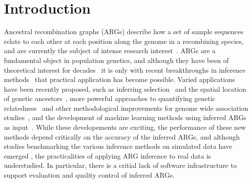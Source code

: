 \documentclass[unnumsec,webpdf,contemporary,large,namedate]{oup-authoring-template}%
\begin{document}
 \maketitle 

\section{Introduction} 
Ancestral recombination graphs (ARGs) describe how a set of sample
sequences relate to each other at each position along the genome in a recombining
species, and are currently the subject of intense research 
interest~\citep{brandt2024promise,lewanski2024era,nielsen2024inference,
wong2024general}. ARGs are a fundamental object in population genetics,
and although they have been of theoretical interest for
decades~\citep{Hudson1983,Griffiths1997} it is only with recent breakthroughs
in inference methods~\citep{rasmussen2014genome,
speidel2019method,kelleher2019inferring,wohns2022unified,zhang2023biobank,
gunnarsson2024scalable,deng2024robust} that practical application has 
become possible. Varied applications have been recently proposed,
such as inferring selection~\citep{stern2019approximate,hejase2022deep} and 
the spatial 
location of genetic
ancestors~\citep{osmond2024estimating,deraje2024inferring,grundler2024geographic},
more powerful approaches to quantifying genetic 
relatedness~\citep{fan2022genealogical,zhang2023biobank,gunnarsson2024scalable,lehmann2025on}
and other methodological improvements for genome wide association 
studies~\citep{nowbandegani2023extremely,link2023tree},
and the development of machine learning methods using inferred
ARGs as input~\citep{hejase2022deep,pearson2023local,korfmann2024simultaneous,
whitehouse2024tree}.
While these developements are exciting, the performance 
of these new methods depend critically on the accuracy of the inferred ARGs,
and although studies benchmarking the various inference methods on 
simulated data have emerged 
\citep{brandt2022evaluation,deng2024robust,peng2024evaluating},
the practicalities of applying ARG inference to real data is 
understudied. In particular, there is a critial lack of software 
infrastructure to support evaluation and quality control of 
inferred ARGs.
\end{document}
